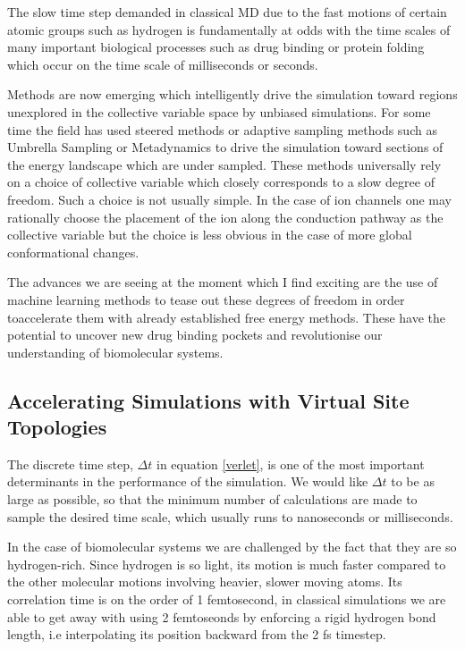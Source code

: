 The slow time step demanded in classical MD due to the fast motions of certain atomic groups such as hydrogen is fundamentally at odds with the time scales of many important biological processes such as drug binding or protein folding which occur on the time scale of  milliseconds or seconds. 

Methods are now emerging which intelligently drive the simulation toward regions unexplored in the collective variable space by unbiased simulations. For some time the field has used steered methods or adaptive sampling methods such as Umbrella Sampling or Metadynamics to drive the simulation toward sections of the energy landscape which are under sampled. These methods universally rely on a choice of collective variable which closely corresponds to a slow degree of freedom. Such a choice is not usually simple. In the case of ion channels one may rationally choose the placement of the ion along the conduction pathway as the collective variable but the choice is less obvious in the case of more global conformational changes.

The advances we are seeing at the moment which I find exciting are the use of machine learning methods to tease out these degrees of freedom in order toaccelerate them with already established free energy methods. These have the potential to uncover new drug binding pockets and revolutionise our understanding of biomolecular systems. 


\subsection{Accelerating Simulations with Virtual Site Topologies}
The discrete time step, $\Delta t$ in equation \ref{verlet}, is one of the most important determinants in the performance of the simulation. We would like $\Delta t$ to be as large as possible, so that the minimum number of calculations are made to sample the desired time scale, which usually runs to nanoseconds or milliseconds.  

In the case of biomolecular systems we are challenged by the fact that they are so hydrogen-rich. Since hydrogen is so light, its motion is much faster compared to the other molecular motions involving heavier, slower moving atoms. Its correlation time is on the order of 1 femtosecond, in classical simulations we are able to get away with using 2 femtoseonds by enforcing a rigid hydrogen bond length, i.e interpolating its position backward from the 2 fs timestep.  

